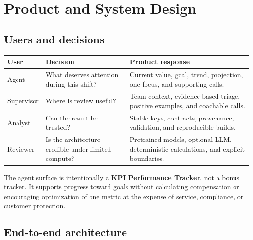 \documentclass[11pt,letterpaper]{article}
\begin{document}
\clearpage
\section{Product and System Design}

\subsection{Users and decisions}

\begin{center}\small
\begin{tabular}{p{}p{}p{}}
\toprule
User & Decision & Product response \\
\midrule
Agent & What deserves attention during this shift? & Current value, goal, trend,
projection, one focus, and supporting calls. \\
Supervisor & Where is review useful? & Team context, evidence-based triage, positive
examples, and coachable calls. \\
Analyst & Can the result be trusted? & Stable keys, contracts, provenance, validation,
and reproducible builds. \\
Reviewer & Is the architecture credible under limited compute? & Pretrained models,
optional LLM, deterministic calculations, and explicit boundaries. \\
\bottomrule
\end{tabular}
\end{center}

The agent surface is intentionally a \textbf{KPI Performance Tracker}, not a bonus
tracker. It supports progress toward goals without calculating compensation or
encouraging optimization of one metric at the expense of service, compliance, or
customer protection.

\subsection{End-to-end architecture}
\end{document}
